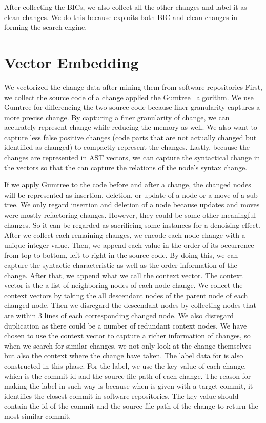 After collecting the BICs, we also collect all the other changes and label it as clean changes.
We do this because {\simfin} exploits both BIC and clean changes in forming the search engine.

\section{Vector Embedding}
We vectorized the change data after mining them from software repositories
First, we collect the source code of a change applied the Gumtree~\cite{falleri2014fine} algorithm.
We use Gumtree for differencing the two source code because finer granularity captures a more precise change.
By capturing a finer granularity of change, we can accurately represent change while reducing the memory as well.
We also want to capture less false positive changes (code parts that are not actually changed but identified as changed) to compactly represent the changes.
Lastly, because the changes are represented in AST vectors, we can capture the syntactical change in the vectors so that the {\simfin} can capture the relations of the node's syntax change.

If we apply Gumtree to the code before and after a change, the changed nodes will be represented as insertion, deletion, or update of a node or a move of a sub-tree.
We only regard insertion and deletion of a node because updates and moves were mostly refactoring changes.
However, they could be some other meaningful changes.
So it can be regarded as sacrificing some instances for a denoising effect.
After we collect each remaining changes, we encode each node-change with a unique integer value. 
Then, we append each value in the order of its occurrence from top to bottom, left to right in the source code.
By doing this, we can capture the syntactic characteristic as well as the order information of the change.
After that, we append what we call the context vector.
The context vector is the a list of neighboring nodes of each node-change.
We collect the context vectors by taking the all descendant nodes of the parent node of each changed node.
Then we disregard the descendant nodes by collecting nodes that are within 3 lines of each corresponding changed node.
We also disregard duplication as there could be a number of redundant context nodes.
We have chosen to use the context vector to capture a richer information of changes, so when we search for similar changes, we not only look at the change themselves but also the context where the change have taken.
The label data for {\simfin} is also constructed in this phase.
For the label, we use the key value of each change, which is the commit id and the source file path of each change. 
The reason for making the label in such way is because when {\simfin} is given with a target commit, it identifies the closest commit in software repositories.
The key value should contain the id of the commit and the source file path of the change to return the most similar commit.

